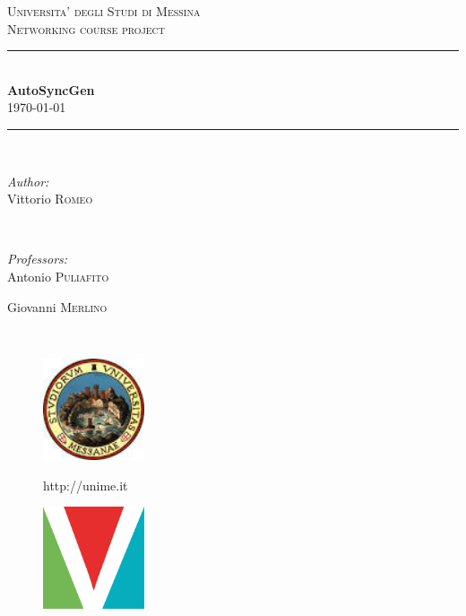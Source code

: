 \documentclass{report}
\newcommand{\HRule}{\rule{\linewidth}{0.5mm}}
\begin{document}
	\begin{titlepage}

		\center

		\textsc{\LARGE Universita' degli Studi di Messina}\\[1.5cm] 
		\textsc{\Large Networking course project}\\[0.5cm] 

		\HRule \\[0.4cm]
		{ \huge \bfseries AutoSyncGen}\\[0.1cm]

		{\large \today}
		\HRule \\[1.5cm]
		 
		\begin{minipage}{0.4\textwidth}
		\begin{flushleft} \large
		\emph{Author:}\\
		Vittorio \textsc{Romeo} %
		\end{flushleft}
		\end{minipage}
		~
		\begin{minipage}{0.4\textwidth}
		\begin{flushright} \large
		\emph{Professors:} \\
		Antonio \textsc{Puliafito}

		Giovanni \textsc{Merlino}
		\end{flushright}
		\end{minipage}\\[4cm]

		\vfill

		\begin{minipage}{\linewidth}
		    \centering
		    \begin{minipage}{0.35\linewidth}
		        \begin{figure}[H]
		          	\center
		            \includegraphics[width=3cm, height=3cm]{logounime}
		            
		            http://unime.it
		        \end{figure}
		    \end{minipage}
		    \hspace{0.27\linewidth}
		    \begin{minipage}{0.35\linewidth}
		        \begin{figure}[H]
		            \center
		            \includegraphics[width=3cm, height=3cm]{logovee}
		            

\end{figure}
\end{minipage}
\end{minipage}
\end{titlepage}
\end{document}
